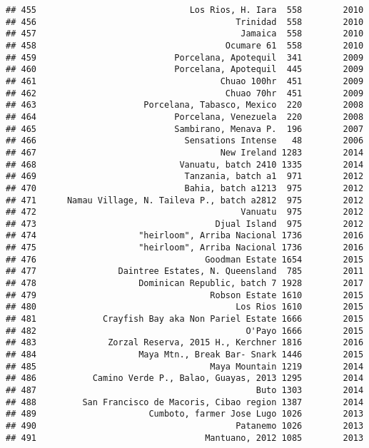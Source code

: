 \documentclass[
]{article}
\begin{document}
\begin{verbatim}
## 455                              Los Rios, H. Iara  558        2010
## 456                                       Trinidad  558        2010
## 457                                        Jamaica  558        2010
## 458                                     Ocumare 61  558        2010
## 459                           Porcelana, Apotequil  341        2009
## 460                           Porcelana, Apotequil  445        2009
## 461                                    Chuao 100hr  451        2009
## 462                                     Chuao 70hr  451        2009
## 463                     Porcelana, Tabasco, Mexico  220        2008
## 464                           Porcelana, Venezuela  220        2008
## 465                           Sambirano, Menava P.  196        2007
## 466                             Sensations Intense   48        2006
## 467                                    New Ireland 1283        2014
## 468                            Vanuatu, batch 2410 1335        2014
## 469                             Tanzania, batch a1  971        2012
## 470                             Bahia, batch a1213  975        2012
## 471      Namau Village, N. Taileva P., batch a2812  975        2012
## 472                                        Vanuatu  975        2012
## 473                                   Djual Island  975        2012
## 474                    "heirloom", Arriba Nacional 1736        2016
## 475                    "heirloom", Arriba Nacional 1736        2016
## 476                                 Goodman Estate 1654        2015
## 477                Daintree Estates, N. Queensland  785        2011
## 478                    Dominican Republic, batch 7 1928        2017
## 479                                  Robson Estate 1610        2015
## 480                                       Los Rios 1610        2015
## 481             Crayfish Bay aka Non Pariel Estate 1666        2015
## 482                                         O'Payo 1666        2015
## 483              Zorzal Reserva, 2015 H., Kerchner 1816        2016
## 484                    Maya Mtn., Break Bar- Snark 1446        2015
## 485                                  Maya Mountain 1219        2014
## 486           Camino Verde P., Balao, Guayas, 2013 1295        2014
## 487                                           Buto 1303        2014
## 488         San Francisco de Macoris, Cibao region 1387        2014
## 489                      Cumboto, farmer Jose Lugo 1026        2013
## 490                                       Patanemo 1026        2013
## 491                                 Mantuano, 2012 1085        2013

\end{verbatim}
\end{document}
